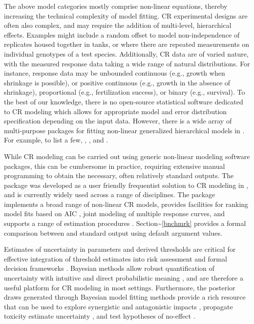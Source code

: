 \documentclass[
  shortnames]{jss}
\begin{document}
The above model categories mostly comprise non-linear equations, thereby increasing the technical complexity of model fitting. CR experimental designs are often also complex, and may require the addition of multi-level, hierarchical effects. Examples might include a random offset to model non-independence of replicates housed together in tanks, or where there are repeated measurements on individual genotypes of a test species. Additionally, CR data are of varied nature, with the measured response data taking a wide range of natural distributions. For instance, response data may be unbounded continuous (e.g., growth when shrinkage is possible), or positive continuous (e.g., growth in the absence of shrinkage), proportional (e.g., fertilization success), or binary (e.g., survival). To the best of our knowledge, there is no open-source statistical software dedicated to CR modeling which allows for appropriate model and error distribution specification depending on the input data. However, there is a wide array of multi-purpose packages for fitting non-linear generalized hierarchical models in . For example, to list a few,  \citep{pinheiro2021},  \citep{pinheiro2021},  \citep{Su2015} and  \citep{rstan2021}.

While CR modeling can be carried out using generic non-linear modeling software packages, this can be cumbersome in practice, requiring extensive manual programming to obtain the necessary, often relatively standard outputs. The  package \citep{Ritz2016} was developed as a user friendly frequentist solution to CR modeling in , and is currently widely used across a range of disciplines. The  package implements a broad range of non-linear CR models, provides facilities for ranking model fits based on AIC \citep{Burnham2002}, joint modeling of multiple response curves, and supports a range of estimation procedures \citep{Ritz2016}. Section\textasciitilde{}\ref{bnchmrk} provides a formal comparison between  and  standard output using default argument values.

Estimates of uncertainty in parameters and derived thresholds are critical for effective integration of threshold estimates into risk assessment and formal decision frameworks \citep{fisher2018c}. Bayesian methods allow robust quantification of uncertainty with intuitive and direct probabilistic meaning \citep{Ellison1996}, and are therefore a useful platform for CR modeling in most settings. Furthermore, the posterior draws generated through Bayesian model fitting methods provide a rich resource that can be used to explore synergistic and antagonistic impacts \citep{Fisher2019d, flores2021}, propagate toxicity estimate uncertainty \citep{Charles2020a, Gottschalk2013}, and test hypotheses of no-effect \citep{Thomas2006}.
\end{document}
